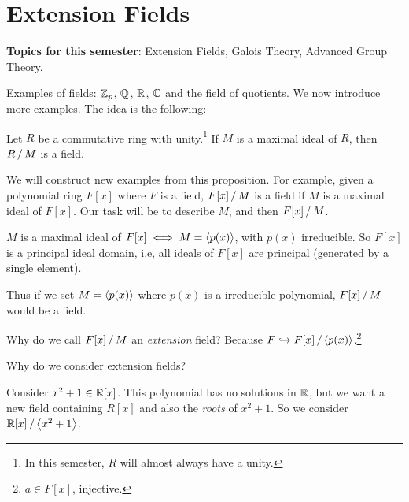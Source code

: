 \setcounter{chapter}{5}

\chapter{Extension Fields}

\textbf{Topics for this semester}: Extension Fields, Galois Theory, Advanced Group Theory.

\setcounter{topic}{28}

Examples of fields: \(\mathbb{Z}_p\), \(\mathbb{Q}\), \(\mathbb{R}\), \(\mathbb{C}\) and the field of quotients. We now introduce more examples. The idea is the following:

\recall Let \(R\) be a commutative ring with unity.\footnote{In this semester, \(R\) will almost always have a unity.} If \(M\) is a maximal ideal of \(R\), then \(R \operatorname{/} M\) is a field.

We will construct new examples from this proposition. For example, given a polynomial ring \(F[x]\) where \(F\) is a field, \(F[x] \operatorname{/} M\) is a field if \(M\) is a maximal ideal of \(F[x]\). Our task will be to describe \(M\), and then \(F[x] \operatorname{/} M\).

\recall \(M\) is a maximal ideal of \(F[x] \iff M = \left\langle p(x) \right\rangle\), with \(p(x)\) irreducible. So \(F[x]\) is a principal ideal domain, i.e, all ideals of \(F[x]\) are principal (generated by a single element).

Thus if we set \(M = \left\langle p(x) \right\rangle\) where \(p(x)\) is a irreducible polynomial, \(F[x] \operatorname{/} M\) would be a field.

\question Why do we call \(F[x] \operatorname{/} M\) an \textit{extension} field? Because \(F \hookrightarrow {F[x]} \operatorname{/} {\left\langle p(x) \right\rangle}\).\footnote{\(a \in F[x]\), injective.}

\question Why do we consider extension fields?

Consider \(x^2 + 1 \in \mathbb{R}[x]\). This polynomial has no solutions in \(\mathbb{R}\), but we want a new field containing \(R[x]\) and also the \textit{roots} of \(x^2 + 1\). So we consider \(\mathbb{R}[x] \operatorname{/} \left\langle x^2 + 1 \right\rangle\).

\pagebreak
